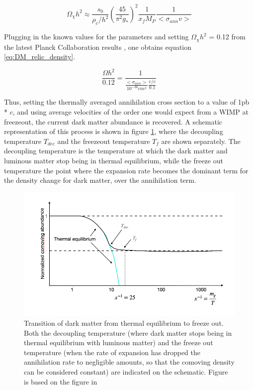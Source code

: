 \begin{equation}
    \label{eq:sol_Boltzmann}
    \Omega_\chi h^2 \approx \frac{s_0}{\rho_c/h^2} \left( \frac{45}{\pi^2g_*}\right)^2 \frac{1}{x_f M_P} \frac{1}{<\sigma_{ann}v>}
\end{equation}

Plugging in the known values for the parameters\cite{ref 533 DM review} and setting $\Omega_\chi h^2$ = 0.12 from the latest Planck Collaboration results \cite{Planck2018}, one obtains equation \ref{eq:DM_relic_density}. 

\begin{equation}
    \label{eq:DM_relic_density}
    \frac{\Omega h^2}{0.12} = \frac{1}{\frac{<\sigma_{ann}>}{10^{-36} cm^2} \frac{v/c}{0.1}}
\end{equation}

Thus, setting the thermally averaged annihilation cross section to a value of 1pb * $c$, and using average velocities of the order one would expect from a WIMP at freezeout, the current dark matter abundance is recovered. A schematic representation of this process is shown in figure \ref{fig:DM_thremal_eq_freeze_out}, where the decoupling temperature $T_{dec}$ and the freezeout temperature $T_{f}$ are shown separately. The decoupling temperature is the temperature at which the dark matter and luminous matter stop being in thermal equilibrium, while the freeze out temperature the point where the expansion rate becomes the dominant term for the density change for dark matter, over the annihilation term. 

\begin{figure}[h!]
    \centering
    \includegraphics[width=\textwidth]{figures/schematic_thermal_eq_evolution_DM.png}
    \caption{Transition of dark matter from thermal equilibrium to freeze out. Both the decoupling temperature (where dark matter stops being in thermal equilibrium with luminous matter) and the freeze out temperature (when the rate of expansion has dropped the annihilation rate to negligible amounts, so that the comoving density can be considered constant) are indicated on the schematic. Figure is based on the figure in \cite{Baer}}
    \label{fig:DM_thremal_eq_freeze_out}
\end{figure}



